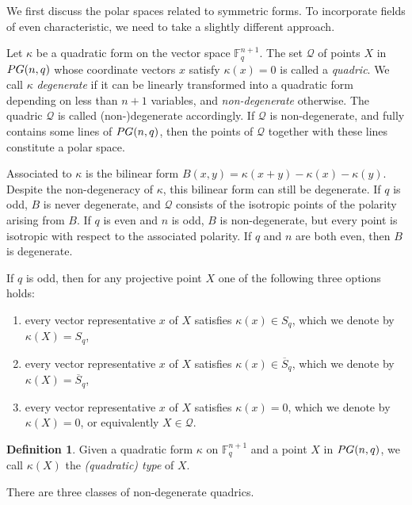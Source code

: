 \documentclass[a4paper]{article}
\theoremstyle{definition}
\newtheorem{df}[thm]{Definition}
\newcommand{\FF}{\mathbb F}
\newcommand{\pg}{\textnormal{PG}}
\newcommand{\mq}{\mathcal Q}
\newcommand{\ns}{\overline S}
\begin{document}
We first discuss the polar spaces related to symmetric forms.
To incorporate fields of even characteristic, we need to take a slightly different approach.

Let $\kappa$ be a quadratic form on the vector space $\FF_q^{n+1}$.
The set $\mq$ of points $X$ in $\pg(n,q)$ whose coordinate vectors $x$ satisfy $\kappa(x) = 0$ is called a \emph{quadric}.
We call $\kappa$ \emph{degenerate} if it can be linearly transformed into a quadratic form depending on less than $n+1$ variables, and \emph{non-degenerate} otherwise.
The quadric $\mq$ is called (non-)degenerate accordingly.
If $\mq$ is non-degenerate, and fully contains some lines of $\pg(n,q)$, then the points of $\mq$ together with these lines constitute a polar space.

Associated to $\kappa$ is the bilinear form $B(x,y) = \kappa(x+y) - \kappa(x) - \kappa(y)$.
Despite the non-degeneracy of $\kappa$, this bilinear form can still be degenerate.
If $q$ is odd, $B$ is never degenerate, and $\mq$ consists of the isotropic points of the polarity arising from $B$.
If $q$ is even and $n$ is odd, $B$ is non-degenerate, but every point is isotropic with respect to the associated polarity.
If $q$ and $n$ are both even, then $B$ is degenerate.

If $q$ is odd, then for any projective point $X$ one of the following three options holds:
\begin{enumerate}
 \item every vector representative $x$ of $X$ satisfies $\kappa(x) \in S_q$, which we denote by $\kappa(X) = S_q$,
 \item every vector representative $x$ of $X$ satisfies $\kappa(x) \in \ns_q$, which we denote by $\kappa(X) = \ns_q$,
 \item every vector representative $x$ of $X$ satisfies $\kappa(x) = 0$, which we denote by $\kappa(X) = 0$, or equivalently $X \in \mq$.
\end{enumerate}

\begin{df}
 \label{Df:QuadraticType}
    Given a quadratic form $\kappa$ on $\FF_q^{n+1}$ and a point $X$ in $\pg(n,q)$, we call $\kappa(X)$ the \emph{(quadratic) type} of $X$.
\end{df}

There are three classes of non-degenerate quadrics.
\end{document}
